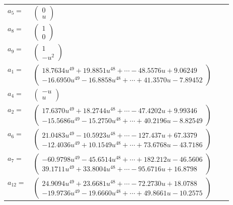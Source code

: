 \documentclass[1p]{elsarticle_modified}
\theoremstyle{definition}
\begin{document}
\begin{tabular}{m{7pt} m{180pt} m{7pt} m{180pt} }
\flushright $a_{5}=$&$\begin{pmatrix}0\\u\end{pmatrix}$ \\
\flushright $a_{8}=$&$\begin{pmatrix}1\\0\end{pmatrix}$ \\
\flushright $a_{9}=$&$\begin{pmatrix}1\\- u^2\end{pmatrix}$ \\
\flushright $a_{1}=$&$\begin{pmatrix}18.7634 u^{49}+19.8851 u^{48}+\cdots-48.5576 u+9.06249\\-16.6950 u^{49}-16.8858 u^{48}+\cdots+41.3570 u-7.89452\end{pmatrix}$ \\
\flushright $a_{4}=$&$\begin{pmatrix}- u\\u\end{pmatrix}$ \\
\flushright $a_{2}=$&$\begin{pmatrix}17.6370 u^{49}+18.2744 u^{48}+\cdots-47.4202 u+9.99346\\-15.5686 u^{49}-15.2750 u^{48}+\cdots+40.2196 u-8.82549\end{pmatrix}$ \\
\flushright $a_{6}=$&$\begin{pmatrix}21.0483 u^{49}-10.5923 u^{48}+\cdots-127.437 u+67.3379\\-12.4036 u^{49}+10.1549 u^{48}+\cdots+73.6768 u-43.7186\end{pmatrix}$ \\
\flushright $a_{7}=$&$\begin{pmatrix}-60.9798 u^{49}-45.6514 u^{48}+\cdots+182.212 u-46.5606\\39.1711 u^{49}+33.8004 u^{48}+\cdots-95.6716 u+16.8798\end{pmatrix}$ \\
\flushright $a_{12}=$&$\begin{pmatrix}24.9094 u^{49}+23.6681 u^{48}+\cdots-72.2730 u+18.0788\\-19.9736 u^{49}-19.6660 u^{48}+\cdots+49.8661 u-10.2575\end{pmatrix}$ \\

\end{tabular}
\end{document}
